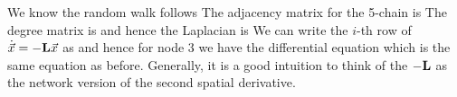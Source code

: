 \solution 
We know the random walk follows 
The adjacency matrix for the 5-chain is 
The degree matrix is 
and hence the Laplacian is 
We can write the $i$-th row of $\dot{\vec{x}}=-{\bf L}\vec{x}$ as 
and hence for node 3 we have the differential equation 
which is the same equation as before. Generally, it is a good intuition to think of the $-{\bf L}$ as the network version of the second spatial derivative.   



